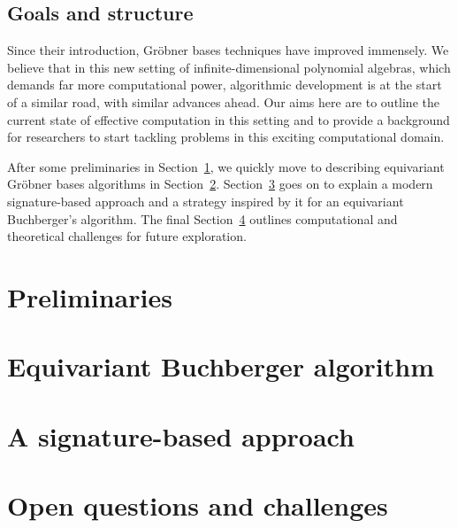 \documentclass[11pt]{amsart}
\theoremstyle{definition}
\numberwithin{equation}{section}
\begin{document}


\subsection{Goals and structure}

Since their introduction, Gr\"obner bases techniques have improved immensely.  We believe that in this new setting of infinite-dimensional polynomial algebras, which demands far more computational power, algorithmic development is at the start of a similar road, with similar advances ahead. Our aims here are to outline the current state of effective computation in this setting and to provide a background for researchers to start tackling problems in this exciting computational domain. %

After some preliminaries in Section~\ref{prelim}, we quickly move to describing equivariant Gr\"obner bases algorithms in Section~\ref{EGB}.  Section~\ref{sec:signature} goes on to explain a modern signature-based approach and a strategy inspired by it for an equivariant Buchberger's algorithm. The final Section~\ref{sec:challenges} outlines computational and theoretical challenges for future exploration.

\section{Preliminaries}\label{prelim}



\section{Equivariant Buchberger algorithm}\label{EGB}



\section{A signature-based approach}\label{sec:signature}



\section{Open questions and challenges}\label{sec:challenges}






\end{document}
